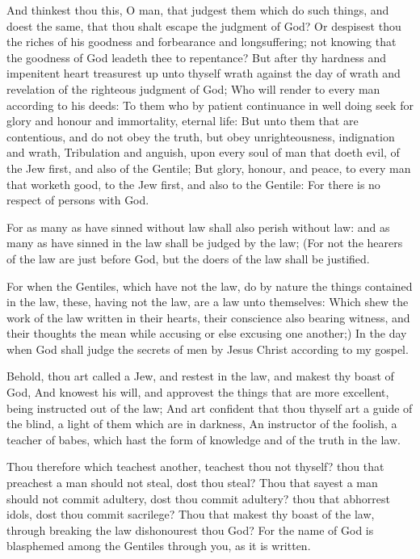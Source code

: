 \verse And thinkest thou this, O man, that judgest them which do such things, and doest the same, that thou shalt escape the judgment of God?  \verse Or despisest thou the riches of his goodness and forbearance and longsuffering; not knowing that the goodness of God leadeth thee to repentance?  \verse But after thy hardness and impenitent heart treasurest up unto thyself wrath against the day of wrath and revelation of the righteous judgment of God; \verse Who will render to every man according to his deeds: \verse To them who by patient continuance in well doing seek for glory and honour and immortality, eternal life: \verse But unto them that are contentious, and do not obey the truth, but obey unrighteousness, indignation and wrath, \verse Tribulation and anguish, upon every soul of man that doeth evil, of the Jew first, and also of the Gentile; \verse But glory, honour, and peace, to every man that worketh good, to the Jew first, and also to the Gentile: \verse For there is no respect of persons with God.

\verse For as many as have sinned without law shall also perish without law: and as many as have sinned in the law shall be judged by the law; \verse (For not the hearers of the law are just before God, but the doers of the law shall be justified.

\verse For when the Gentiles, which have not the law, do by nature the things contained in the law, these, having not the law, are a law unto themselves: \verse Which shew the work of the law written in their hearts, their conscience also bearing witness, and their thoughts the mean while accusing or else excusing one another;) \verse In the day when God shall judge the secrets of men by Jesus Christ according to my gospel.

\verse Behold, thou art called a Jew, and restest in the law, and makest thy boast of God, \verse And knowest his will, and approvest the things that are more excellent, being instructed out of the law; \verse And art confident that thou thyself art a guide of the blind, a light of them which are in darkness, \verse An instructor of the foolish, a teacher of babes, which hast the form of knowledge and of the truth in the law.

\verse Thou therefore which teachest another, teachest thou not thyself?  thou that preachest a man should not steal, dost thou steal?  \verse Thou that sayest a man should not commit adultery, dost thou commit adultery? thou that abhorrest idols, dost thou commit sacrilege?  \verse Thou that makest thy boast of the law, through breaking the law dishonourest thou God?  \verse For the name of God is blasphemed among the Gentiles through you, as it is written.

